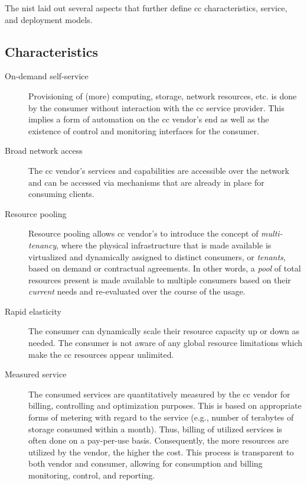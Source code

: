 		The \ac{nist} laid out several aspects that further define \ac{cc} characteristics, service, and deployment models.
		
		
		\subsection{Characteristics} \label{subsec:foundations-intro_cc-characteristics}
			\begin{description}
				\item[On-demand self-service] Provisioning of (more) computing, storage, network resources, etc. is done by the consumer without interaction with the \ac{cc} service provider. \cite{NISTcc} This implies a form of automation on the \ac{cc} vendor's end as well as the existence of control and monitoring interfaces for the consumer. \cite[p.\ 51]{Kumar2018} 
				\item[Broad network access] The \ac{cc} vendor's services and capabilities are accessible over the network and can be accessed via mechanisms that are already in place for consuming clients. \cite{NISTcc}\cite[p.\ 45]{Kumar2018}
				\item[Resource pooling] Resource pooling allows \ac{cc} vendor's to introduce the concept of \textit{multi-tenancy}, where the physical infrastructure that is made available is virtualized and dynamically assigned to distinct consumers, or \textit{tenants}, based on demand or contractual agreements. \cite{NISTcc}\cite[p.\ 45]{Kumar2018} In other words, a \textit{pool} of total resources present is made available to multiple consumers based on their \textit{current} needs and re-evaluated over the course of the usage.
				\item[Rapid elasticity] The consumer can dynamically scale their resource capacity up or down as needed. The consumer is not aware of any global resource limitations which make the \ac{cc} resources appear unlimited. \cite{NISTcc}
				\item[Measured service] The consumed services are quantitatively measured by the \ac{cc} vendor for billing, controlling and optimization purposes. This is based on appropriate forms of metering with regard to the service (e.g., number of terabytes of storage consumed within a month). Thus, billing of utilized services is often done on a pay-per-use basis. \cite{NISTcc} Consequently, the more resources are utilized by the vendor, the higher the cost. This process is transparent to both vendor and consumer, allowing for consumption and billing monitoring, control, and reporting. \cite{NISTcc}
			\end{description}
			
